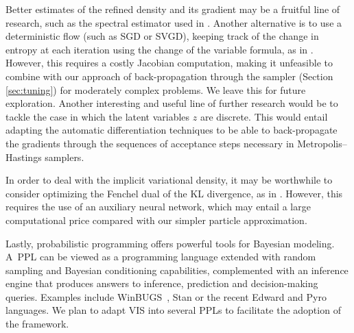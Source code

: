 Better estimates of the refined density and its gradient may be a fruitful line of research, such as the spectral estimator used in \parencite{shi2018spectral}. Another alternative is to use a deterministic flow (such as SGD or SVGD), keeping
track of the change in entropy at each iteration using the change of the variable formula, as in \parencite{duvenaud2016early}. However, this requires a costly Jacobian computation, making it unfeasible to combine with our approach of back-propagation through the sampler (Section \ref{sec:tuning}) for moderately complex problems. We leave this for future exploration. {Another interesting and useful line of further research would be to tackle the case in which the latent variables $z$ are discrete. This would entail adapting the automatic differentiation techniques to be able to back-propagate the gradients through the sequences of acceptance steps necessary in Metropolis--Hastings samplers.}

In order to deal with the implicit variational density, it may be worthwhile to consider optimizing the Fenchel dual of the KL divergence, as
 in \parencite{fang2019implicit}. However, this requires the use of an auxiliary neural network, which may entail a large computational price compared with our simpler particle approximation.

Lastly, probabilistic programming offers powerful tools for Bayesian modeling.
A~PPL can be viewed as a programming language extended with random sampling and Bayesian conditioning capabilities, complemented with an inference engine that produces answers to inference, prediction and decision-making queries. Examples 
include WinBUGS~\parencite{lunn2000winbugs}, Stan \parencite{carpenter2017stan} or the recent Edward \parencite{tran2018simple} and Pyro \parencite{bingham2018pyro} languages. We plan to adapt VIS into several PPLs to facilitate the adoption of the framework.


